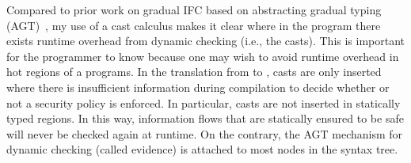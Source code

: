 Compared to prior work on gradual IFC based on abstracting gradual typing
(AGT)~\parencite{Toro:2018aa}, my use of a cast calculus makes it clear where in
the program there exists runtime overhead from dynamic checking (i.e., the
casts). This is important for the programmer to know because one may wish to
avoid runtime overhead in hot regions of a programs. In the translation from
\Surface to \CC, casts are only inserted where there is insufficient information
during compilation to decide whether or not a security policy is enforced. In
particular, casts are not inserted in statically typed regions. In this way,
information flows that are statically ensured to be safe will never be checked
again at runtime. On the contrary, the AGT mechanism for dynamic checking
(called evidence) is attached to most nodes in the syntax tree.

